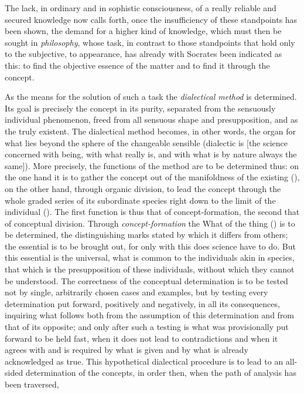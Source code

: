 The lack, in ordinary and in sophistic consciousness,
of a really reliable and secured knowledge now calls forth,
once the insufficiency of these standpoints has been shown,
the demand for a higher kind of knowledge, which must then be sought in
\emph{philosophy}, whose task, in contrast to those standpoints that
hold only to the subjective, to appearance, has already with Socrates
been indicated as this: to find the objective essence of the matter and to
find it through the concept.

As the means for the solution of such a task the
\emph{dialectical method} is determined. Its goal is precisely the concept
in its purity, separated from the sensuously individual phenomenon,
freed from all sensuous shape and presupposition, and as the
truly existent. The dialectical method becomes, in other
words, the organ for what lies beyond the sphere of the changeable
sensible (dialectic is  [the science concerned with being, with what really is, and with what is by nature always the same]). More precisely,
the functions of the method are to be determined thus: on
the one hand it is to gather the concept out of the manifoldness of the existing
(), on the other hand, through
organic division, to lead the concept through the whole graded series of
its subordinate species right down to the limit of the individual
(). The first function is thus that of concept-formation,
the second that of conceptual division. Through \emph{concept-formation}
the What of the thing () is to be determined, the
distinguishing marks stated by which it differs from others;
the essential is to be brought out, for only with this does science
have to do. But this essential is the universal, what is common to the
individuals akin in species, that which is the presupposition of these individuals, without which they cannot be understood. The correctness
of the conceptual determination is to be tested not by single, arbitrarily chosen cases and examples, but by testing every
determination put forward, positively and negatively, in all its
consequences, inquiring what follows both from
the assumption of this determination and from that of its opposite;
and only after such a testing is what was provisionally put forward to be held fast, when it does not lead to contradictions and when
it agrees with and is required by what is given and by what
is already acknowledged as true. This hypothetical
dialectical procedure is to lead to an all-sided determination of the concepts, in order then, when the path of analysis has been traversed,
